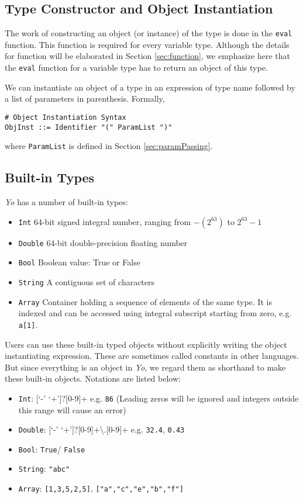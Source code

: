 \documentclass[12pt]{article}
\begin{document}
\subsection{Type Constructor and Object Instantiation}
The work of constructing an object (or instance) of the type is done in the \texttt{eval} function. This function is required for every variable type. Although the details for function will be elaborated in Section \ref{sec:function}, we emphasize here that the \texttt{eval} function for a variable type has to return an object of this type.

We can instantiate an object of a type in an expression of type name followed by a list of parameters in parenthesis. Formally,
\begin{mdframed}[backgroundcolor=lightgray,hidealllines=true]
\begin{verbatim}
# Object Instantiation Syntax
ObjInst ::= Identifier "(" ParamList ")"
\end{verbatim}
\end{mdframed}
where \texttt{ParamList} is defined in Section \ref{sec:paramPassing}.

\subsection{Built-in Types} %
\textit{Yo} has a number of built-in types:
\begin{itemize}
\item \texttt{Int} 64-bit signed integral number, ranging from $-(2^{63})$ to $2^{63}-1$
\item \texttt{Double} 64-bit double-precision floating number
\item \texttt{Bool} Boolean value: True or False
\item \texttt{String} A contiguous set of characters
\item \texttt{Array} Container holding a sequence of elements of the same type. It is indexed and can be accessed using integral subscript starting from zero, e.g. \texttt{a[1]}.
\end{itemize}

Users can use these built-in typed objects without explicitly writing the object instantiating expression. These are sometimes called constants in other languages. But since everything is an object in \textit{Yo}, we regard them as shorthand to make these built-in objects. Notations are listed below:

\begin{itemize}
\item \texttt{Int}: [`-' `+']?[0-9]+ e.g. \texttt{86} (Leading zeros will be ignored and integers outside this range will cause an error)
\item \texttt{Double}: [`-' `+']?[0-9]+\textbackslash.[0-9]+ e.g. \texttt{32.4}, \texttt{0.43}
\item \texttt{Bool}: \texttt{True}/ \texttt{False}
\item \texttt{String}: \texttt{"abc"}
\item \texttt{Array}: \texttt{[1,3,5,2,5]}, \texttt{["a","c","e","b","f"]}
\end{itemize}
\end{document}
